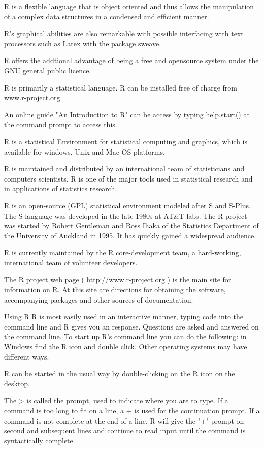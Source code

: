R is a flexible language that is object oriented and thus allows the manipulation of a complex data structures in a condensed and efficient manner.


R's graphical abilities are also remarkable with possible interfacing with text processors such as Latex with the package sweave.

R offers the addtional advantage of being a free and opensource system under the GNU general public licence.

R is primarily a statistical language. R can be installed free of charge from www.r-project.org

An online guide "An Introduction to R" can be access by typing help.start() at the command prompt to access this.

R is a statistical Environment for statistical computing and graphics, which is available for windows, Unix and Mac OS platforms.

R is maintained and distributed by an international team of statisticians and computers scientists.
R is one of the major tools used in statistical research and in applications of statistics research.

R is an open-source (GPL) statistical environment modeled after S and S-Plus. The S language was developed in the late 1980s at AT&T labs. The R project was started by Robert Gentleman and Ross Ihaka of the Statistics Department of the University of Auckland in 1995. It has quickly gained a widespread audience. 

R is currently maintained by the R core-development team, a hard-working, international team of volunteer developers. 

The R project web page ( http://www.r-project.org ) is the main site for information on R. At this site are directions for obtaining the software, accompanying packages and other sources of documentation.



Using R
R is most easily used in an interactive manner, typing code into the command line and R gives you an response. Questions are asked and answered on the command line. To start up R's command line you can do the following: in Windows find the R icon and double click. Other operating systems may have different ways.

R can be started in the usual way by double-clicking on the R icon on the desktop.


The > is called the prompt, used to indicate where you are to type. If a command is too long to fit on a line, a + is used for the continuation prompt.
If a command is not complete at the end of a line, R will give the "+" prompt on second and subsequent lines and continue to read input until the command is syntactically complete.

